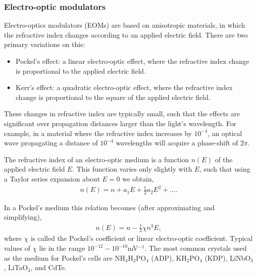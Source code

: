 %
%

\subsubsection{Electro-optic modulators} 

Electro-optics modulators (EOMs) are based on anisotropic materials, in which the refractive index changes according to an applied electric field. There are two primary variations on this:
\begin{itemize}
	\item Pockel's effect: a linear electro-optic effect, where the refractive index change is proportional to the applied electric field.
	\item Kerr's effect: a quadratic electro-optic effect, where the refractive index change is proportional to the square of the applied electric field.
\end{itemize}

These changes in refractive index are typically small, such that the effects are significant over propagation distances larger than the light's wavelength. For example, in a material where the refractive index increases by $10^{-4}$, an optical wave propagating a distance of $10^{-4}$ wavelengths will acquire a phase-shift of $2\pi$.

The refractive index of an electro-optic medium is a function $n(E)$ of the applied electric field $E$. This function varies only slightly with $E$, such that using a Taylor series expansion about \mbox{$E=0$} we obtain,
\begin{align}
n(E) = n+a_1E + \frac{1}{2}a_2E^2+\dots.
\end{align}

In a Pockel's medium this relation becomes (after approximating and simplifying),
\begin{align}
n(E) = n-\frac{1}{2}\chi n^3 E,
\end{align}
where $\chi$ is called the Pockel's coefficient or linear electro-optic coefficient. Typical values of $\chi$ lie in the range $10^{-12}-10^{-10}$mV$^{-1}$. The most common crystals used as the medium for Pockel's cells are NH$_4$H$_2$PO$_4$ (ADP), KH$_2$PO$_4$ (KDP), LiNbO$_3$, LiTaO$_3$, and CdTe.

